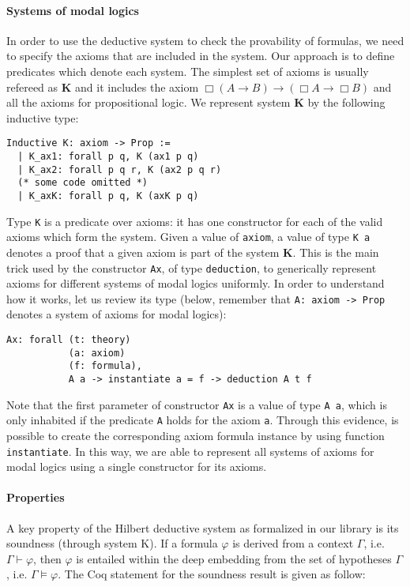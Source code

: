 \documentclass[sigconf]{acmart}
\begin{document}
\paragraph{Systems of modal logics} In order to use the deductive system to
check the provability of formulas, we need to specify the axioms that are
included in the system. Our approach is to define predicates
which denote each system. The simplest set of axioms is usually refereed as
\textbf{K} and it includes the axiom $\Box(A \to B) \to (\Box A \to \Box B)$
and all the axioms for propositional logic. We represent system \textbf{K}
by the following inductive type:
\begin{verbatim}
Inductive K: axiom -> Prop :=
  | K_ax1: forall p q, K (ax1 p q)
  | K_ax2: forall p q r, K (ax2 p q r)
  (* some code omitted *)
  | K_axK: forall p q, K (axK p q)
\end{verbatim}
Type \texttt{K} is a predicate over axioms: it has one constructor for
each of the valid axioms which form the system. Given a value
of \texttt{axiom}, a value of type \texttt{K a} denotes a
proof that a given axiom is part of the system \textbf{K}. This is the main
trick used by the constructor \texttt{Ax}, of type
\texttt{deduction}, to generically represent axioms for
different systems of modal logics uniformly. In order to understand how it
works, let us review its type (below, remember that \texttt{A: axiom -> Prop}
denotes a system of axioms for modal logics):
\begin{verbatim}
Ax: forall (t: theory)
           (a: axiom)
           (f: formula),
           A a -> instantiate a = f -> deduction A t f
\end{verbatim}
Note that the first parameter of constructor \texttt{Ax} is a value
of type \texttt{A a}, which is only inhabited if the predicate
\texttt{A} holds for the axiom \texttt{a}. Through this
evidence, is possible to create the corresponding axiom formula instance by
using function \texttt{instantiate}. In this way, we are able to
represent all systems of axioms for modal logics using a single constructor
for its axioms.

\paragraph{Properties} A key property of the Hilbert deductive system as formalized
in our library is its soundness (through system K). If a formula $\varphi$ is derived from a
context $\Gamma$, i.e. $\Gamma\vdash\varphi$, then $\varphi$ is entailed within the deep embedding
from the set of hypotheses $\Gamma$, i.e. $\Gamma\models\varphi$. The Coq statement for the soundness
result is given as follow:
\end{document}
